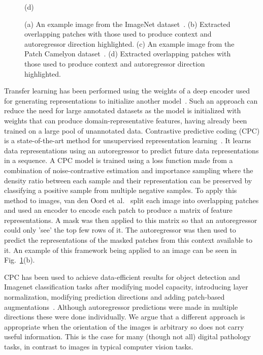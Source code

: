 \begin{figure}
\begin{minipage}[b]{.48\linewidth}
		\centerline{(d)}\medskip
	\end{minipage}
	\caption{(a) An example image from the ImageNet dataset~\cite{deng2009imagenet}. (b) Extracted overlapping patches with those used to produce context and autoregressor direction highlighted. (c) An example image from the Patch Camelyon dataset~\cite{veeling2018rotation}. (d) Extracted overlapping patches with those used to produce context and autoregressor direction highlighted.}
	\label{fig:example_cpc_patches}
\end{figure}

Transfer learning has been performed using the weights of a deep encoder used for generating representations to initialize another model~\cite{weiss2016survey}. Such an approach can reduce the need for large annotated datasets as the model is initialized with weights that can produce domain-representative features, having already been trained on a large pool of unannotated data. 
Contrastive predictive coding (CPC) is a state-of-the-art method for unsupervised representation learning~\cite{oord2018representation}. It learns data representations using an autoregressor to predict future data representations in a sequence. A CPC model is trained using a loss function made from a combination of noise-contrastive estimation and importance sampling where the density ratio between each sample and their representation can be preserved by classifying a positive sample from multiple negative samples. To apply this method to images, van den Oord et al.~\cite{oord2018representation} split each image into overlapping patches and used an encoder to encode each patch to produce a matrix of feature representations. A mask was then applied to this matrix so that an autoregressor could only 'see' the top few rows of it. The autoregressor was then used to predict the representations of the masked patches from this context available to it. An example of this framework being applied to an image can be seen in Fig.~\ref{fig:example_cpc_patches}(b). 

CPC has been used to achieve data-efficient results for object detection and Imagenet classification tasks after modifying model capacity, introducing layer normalization, modifying prediction directions and adding patch-based augmentations~\cite{henaff2019data}. Although autoregressor predictions were made in multiple directions these were done individually. We argue that a different approach is appropriate when the orientation of the images is arbitrary so does not carry useful information. This is the case for many (though not all) digital pathology tasks, in contrast to images in typical computer vision tasks. 

